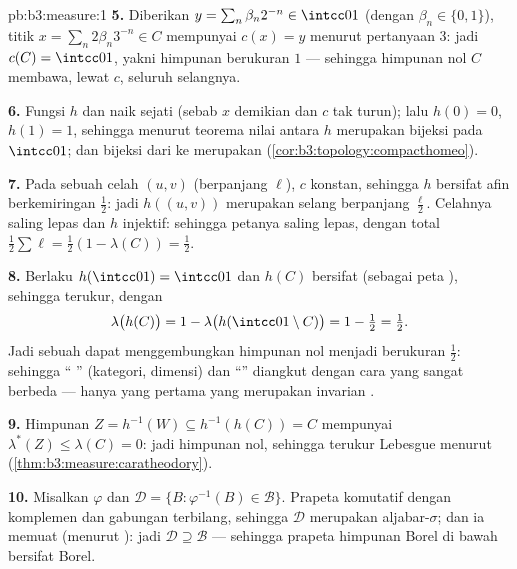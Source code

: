 \begin{solution}{pb:b3:measure:1}
\textbf{5.} Diberikan $y = \sum_n\beta_n2^{-n} \in \intcc01$
(dengan $\beta_n \in \{0,1\}$), titik $x = \sum_n2\beta_n3^{-n}
\in C$ mempunyai $c(x) = y$ menurut pertanyaan 3: jadi $c(C) = \intcc01$, yakni himpunan
berukuran $1$ --- sehingga himpunan nol $C$ membawa, lewat $c$,
seluruh selangnya.

\textbf{6.} Fungsi $h$  dan naik sejati (sebab $x$ demikian
dan $c$ tak turun); lalu $h(0) = 0$, $h(1) = 1$, sehingga menurut
teorema nilai antara $h$ merupakan bijeksi  pada
$\intcc01$; dan bijeksi  dari  ke  merupakan 
(\cref{cor:b3:topology:compacthomeo}).

\textbf{7.} Pada sebuah celah $(u, v)$ (berpanjang $\ell$), $c$ konstan,
sehingga $h$ bersifat afin berkemiringan $\frac12$: jadi $h((u,v))$ merupakan
selang berpanjang $\frac\ell2$. Celahnya saling lepas dan $h$
injektif: sehingga petanya saling lepas, dengan  total
$\frac12\sum\ell = \frac12(1 - \lambda(C)) = \frac12$.

\textbf{8.} Berlaku $h(\intcc01) = \intcc01$ dan $h(C)$ bersifat 
(sebagai peta ), sehingga terukur, dengan
\[
\lambda\bigl(h(C)\bigr) = 1 -
\lambda\bigl(h(\intcc01\setminus C)\bigr) = 1 - \tfrac12 =
\tfrac12 .
\]
Jadi sebuah  dapat menggembungkan himpunan nol menjadi berukuran $\frac12$:
sehingga `` '' (kategori, dimensi) dan ``'' diangkut
 dengan cara yang sangat berbeda --- hanya yang
pertama yang merupakan invarian .

\textbf{9.} Himpunan $Z = h^{-1}(W) \subseteq h^{-1}(h(C)) = C$ mempunyai
$\lambda^*(Z) \leq \lambda(C) = 0$: jadi himpunan nol, sehingga
terukur Lebesgue menurut 
(\cref{thm:b3:measure:caratheodory}).

\textbf{10.} Misalkan $\varphi$  dan $\mathcal D = \{B
: \varphi^{-1}(B) \in \mathcal B\}$. Prapeta komutatif dengan
komplemen dan gabungan terbilang, sehingga $\mathcal D$ merupakan
aljabar-$\sigma$; dan ia memuat  (menurut ):
jadi $\mathcal D \supseteq \mathcal B$ --- sehingga prapeta himpunan Borel
di bawah  bersifat Borel.


\end{solution}
